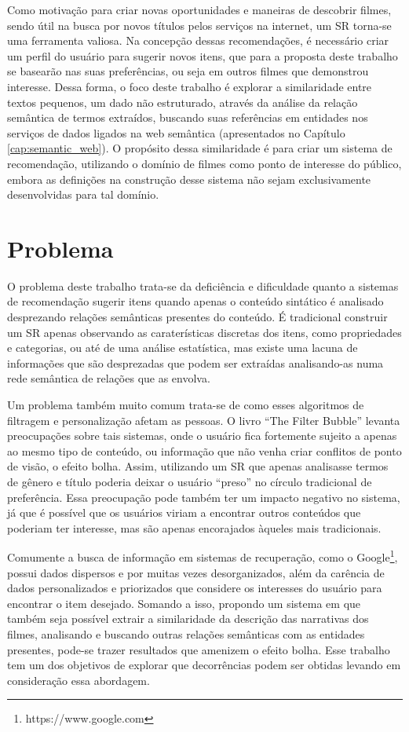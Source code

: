 Como motivação para criar novas oportunidades e maneiras de descobrir filmes, sendo útil na busca por novos títulos pelos serviços na internet, um \ac{SR} torna-se uma ferramenta valiosa. Na concepção dessas recomendações, é necessário criar um perfil do usuário para sugerir novos itens, que para a proposta deste trabalho se basearão nas suas preferências, ou seja em outros filmes que demonstrou interesse. Dessa forma, o foco deste trabalho é explorar a similaridade entre textos pequenos, um dado não estruturado, através da análise da relação semântica de termos extraídos, buscando suas referências em entidades nos serviços de dados ligados na web semântica (apresentados no Capítulo \ref{cap:semantic_web}). O propósito dessa similaridade é para criar um sistema de recomendação, utilizando o domínio de filmes como ponto de interesse do público, embora as definições na construção desse sistema não sejam exclusivamente desenvolvidas para tal domínio.

\section{Problema}
O problema deste trabalho trata-se da deficiência e dificuldade quanto a sistemas de recomendação sugerir itens quando apenas o conteúdo sintático é analisado desprezando relações semânticas presentes do conteúdo. É tradicional construir um SR apenas observando as caraterísticas discretas dos itens, como propriedades e categorias, ou até de uma análise estatística, mas existe uma lacuna de informações que são desprezadas que podem ser extraídas analisando-as numa rede semântica de relações que as envolva.

Um problema também muito comum trata-se de como esses algoritmos de filtragem e personalização afetam as pessoas. O livro “The Filter Bubble” \cite{Pariser:2011} levanta preocupações sobre tais sistemas, onde o usuário fica fortemente sujeito a apenas ao mesmo tipo de conteúdo, ou informação que não venha criar conflitos de ponto de visão, o efeito bolha. Assim, utilizando um SR que apenas analisasse termos de gênero e título poderia deixar o usuário “preso” no círculo tradicional de preferência. Essa preocupação pode também ter um impacto negativo no sistema, já que é possível que os usuários viriam a encontrar outros conteúdos que poderiam ter interesse, mas são apenas encorajados àqueles mais tradicionais. 

Comumente a busca de informação em sistemas de recuperação, como o Google\footnote{https://www.google.com}, possui dados dispersos e por muitas vezes desorganizados, além da carência de dados personalizados e priorizados que considere os interesses do usuário para encontrar o item desejado. Somando a isso, propondo um sistema em que também seja possível extrair a similaridade da descrição das narrativas dos filmes, analisando e buscando outras relações semânticas com as entidades presentes, pode-se trazer resultados que amenizem o efeito bolha. Esse trabalho tem um dos objetivos de explorar que decorrências podem ser obtidas levando em consideração essa abordagem.

